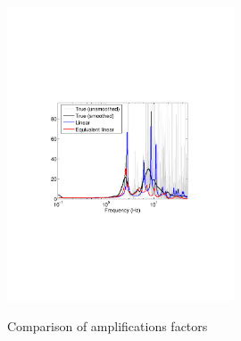 \documentclass[11pt,letterpaper]{article}
\begin{document}
\begin{figure}[h]
    \centering
  \includegraphics[width=0.6\textwidth]{amplification_factor_comparison.pdf}\\
  \caption{Comparison of amplifications factors}\label{fig:af_comparison}
\end{figure}











\end{document}
